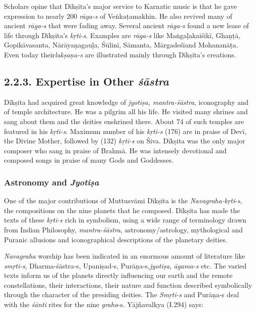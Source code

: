 Scholars opine that Dīkṣita’s major service to Karnatic music is that he gave expression to nearly 200 \textit{rāga-s} of Veṅkaṭamakhin. He also revived many of ancient \textit{rāga-s} that were fading away. Several ancient \textit{rāga-s} found a new lease of life through Dīkṣita’s \textit{kṛti-s}. Examples are \textit{rāga-s} like Maṅgaḷakaiśikī, Ghaṇṭā, Gopikāvasanta, Nārāyaṇagauḷa, Śūlinī, Sāmanta, Mārgadeśīand Mohananāṭa\textit{. }Even today their\break \textit{lakṣaṇa-s} are illustrated mainly through Dīkṣita’s creations.


\subsection*{2.2.3. Expertise in Other \textit{śāstra}}

Dīkṣita had acquired great knowledge of \textit{jyotiṣa, mantra-śāstra}, iconography and of temple architecture. He was a pilgrim all his life. He visited many shrines and sang about them and the deities enshrined there. About 74 of such temples are featured in his \textit{kṛti-s}. Maximum number of his \textit{kṛti-s} (176) are in praise of Devī, the Divine Mother, followed by (132) \textit{kṛti-s} on Śiva. Dīkṣita was the only major composer who sang in praise of Brahmā. He was intensely devotional and composed songs in praise of many Gods and Goddesses.

\subsubsection*{Astronomy and \textit{Jyotiṣa}}

One of the major contributions of Muttusvāmi Dīkṣita is the \textit{Navagraha-kṛti}-\textit{s}, the compositions on the nine planets that he composed. Dīkṣita has made the texts of these \textit{kṛti-s} rich in symbolism, using a wide range of terminology drawn from Indian Philosophy, \textit{mantra-śāstra}, astronomy/astrology, mythological and Puranic allusions and iconographical descriptions of the planetary deities.

\textit{Navagraha} worship has been indicated in an enormous amount of literature like \textit{smṛti-s}, Dharma-śāstra-s, Upaniṣad-s, Purāṇa-s,\break \textit{jyotiṣa}, \textit{āgama-s} etc. The varied texts inform us of the planets directly influencing our earth and the remote constellations, their interactions, their nature and function described symbolically through the character of the presiding deities. The \textit{Smṛti-s} and Purāṇa-s deal with the \textit{śānti} rites for the nine \textit{graha}-s. Yājñavalkya (I.294) says:

